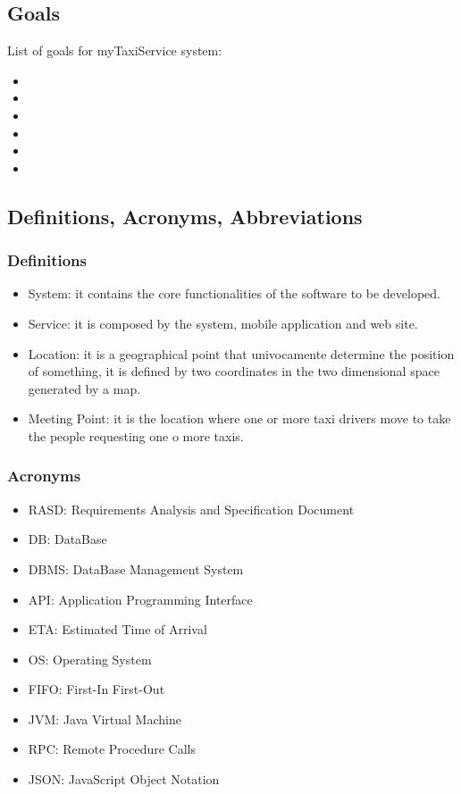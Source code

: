 \documentclass[a4paper,12pt]{article}%
\begin{document}
\subsection{Goals}
List of goals for myTaxiService system:
\begin{itemize}
\item {}
\item {}
\item {}
\item {}
\item {}
\item {}
\end{itemize}
\subsection{Definitions, Acronyms, Abbreviations}
\subsubsection{Definitions}
\begin{itemize}
\item System: it contains the core functionalities of the software to be developed.
\item Service: it is composed by the system, mobile application and web site.
\item Location: it is a geographical point that univocamente determine the position of something, it is defined by two coordinates in the two dimensional space generated by a map.
\item Meeting Point: it is the location where one or more taxi drivers move to take the people requesting one o more taxis.
\end{itemize}
\subsubsection{Acronyms}
\begin{itemize}
\item RASD: Requirements Analysis and Specification Document
\item DB: DataBase
\item DBMS: DataBase Management System
\item API: Application Programming Interface
\item ETA: Estimated Time of Arrival
\item OS: Operating System
\item FIFO: First-In First-Out
\item JVM: Java Virtual Machine
\item RPC: Remote Procedure Calls
\item JSON: JavaScript Object Notation
\end{itemize}
\end{document}
